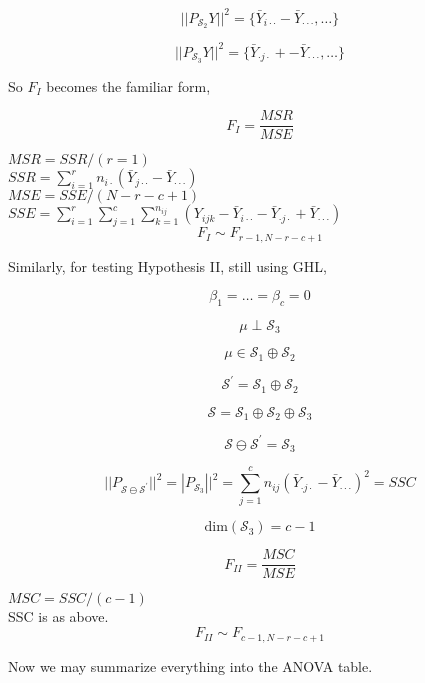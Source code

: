 \documentclass[11pt,fleqn]{book} %
\begin{document}
		$$||P_{\mathcal{S}_2} Y|| ^2 = \{\bar{Y}_{i \cdot \cdot} - \bar{Y}_{\cdot \cdot \cdot}, \dots \} $$

		$$||P_{ \mathcal{S}_3} Y|| ^2 = \{ \bar{Y}_{ \cdot j \cdot} +  - \bar{Y}_{\cdot \cdot \cdot}, \dots\} $$





So $F_I$ becomes the familiar form, 

		$$F_I = \frac{MSR}{MSE} $$

$MSR = SSR / (r = 1)$\\
$SSR = \displaystyle \sum^r_{i = 1} n_{i\cdot} (\bar{Y}_{j \cdot \cdot} - \bar{Y}_{\cdot \cdot \cdot})$\\
$MSE = SSE / (N - r -c +1)$\\
$SSE = \displaystyle \sum^r_{i = 1} \sum^c_{j = 1} \sum^{n_{ij}}_{k = 1} (Y_{ijk} - \bar{Y}_{i \cdot \cdot} - \bar{Y}_{ \cdot j \cdot} + \bar{Y}_{\cdot \cdot \cdot} ) $\\


		$$F_I \sim F_{r - 1 , N - r - c + 1}$$

Similarly, for testing Hypothesis II, still using GHL, 

		$$\beta_1  = \dots = \beta_c = 0 $$

		$$\mu \perp \mathcal{S}_3$$

		$$\mu \in \mathcal{S}_1 \oplus \mathcal{S}_2 $$

		$$\mathcal{S}^\prime = \mathcal{S}_1 \oplus \mathcal{S}_2 $$

		$$\mathcal{S} = \mathcal{S}_1 \oplus \mathcal{S}_2 \oplus \mathcal{S}_3 $$

		$$\mathcal{S} \ominus \mathcal{S}^\prime = \mathcal{S}_3 $$



		$$||P_{\mathcal{S} \ominus \mathcal{S}^\prime} ||^2 = |P_{\mathcal{S}_3} ||^2 = \sum^{c}_{j = 1} n_{ij} (\bar{Y}_{ \cdot j \cdot} -  \bar{Y}_{\cdot \cdot \cdot} )^2 = SSC $$


		$$ \text{dim}(\mathcal{S}_3) = c - 1 $$

		$$F_{II} = \frac{MSC}{MSE} $$


$MSC = SSC / (c-1)$\\
SSC is as above. \\

		$$F_{II} \sim F_{c-1, N -r -c + 1} $$


		Now we may summarize everything into the ANOVA table. 

\end{document}
